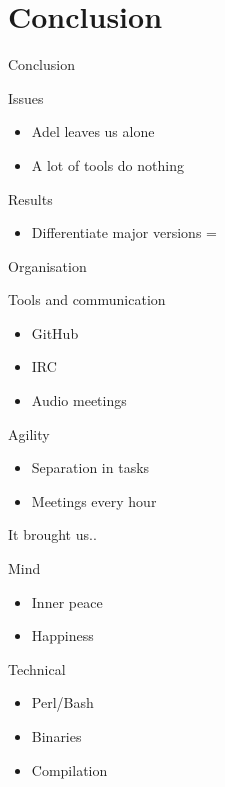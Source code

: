 \documentclass[11pt]{beamer}
\begin{document}
\section{Conclusion}


\begin{frame}{Conclusion}

	\begin{block}{Issues}
		\begin{itemize}
			\item Adel leaves us alone
			\item A lot of tools do nothing
		\end{itemize}
	
	\end{block}
	\begin{block}{Results}
		\begin{itemize}
			\item Differentiate major versions =
		\end{itemize}
		
	\end{block}
\end{frame}

\begin{frame}{Organisation}

\begin{block}{Tools and communication}
\begin{itemize}
	\item GitHub
	\item IRC
	\item Audio meetings
\end{itemize}
\end{block}

\begin{block}{Agility}
	\begin{itemize}
		\item Separation in tasks
		\item Meetings every hour
	\end{itemize}
\end{block}


\end{frame}

\begin{frame}{It brought us..}


\begin{block}{Mind}
	\begin{itemize}
		\item Inner peace
		\item Happiness
	\end{itemize}
\end{block}

\begin{block}{Technical}
	\begin{itemize}
		\item Perl/Bash
		\item Binaries
		\item Compilation
	\end{itemize}
	
\end{block}

\end{frame}
\end{document}
